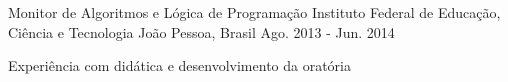 \begin{cventries}
%
%
%

  \cventry
    {Monitor de Algoritmos e Lógica de Programação} %
    {Instituto Federal de Educação, Ciência e Tecnologia} %
    {João Pessoa, Brasil} %
    {Ago. 2013 - Jun. 2014} %
    {
      \begin{cvitems} %
        \item {Experiência com didática e desenvolvimento da oratória}
      \end{cvitems}
    }
\end{cventries}

